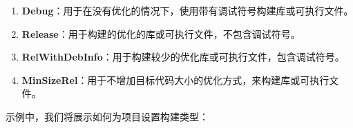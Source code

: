 \begin{enumerate}
\item \textbf{Debug}：用于在没有优化的情况下，使用带有调试符号构建库或可执行文件。

\item \textbf{Release}：用于构建的优化的库或可执行文件，不包含调试符号。

\item \textbf{RelWithDebInfo}：用于构建较少的优化库或可执行文件，包含调试符号。

\item \textbf{MinSizeRel}：用于不增加目标代码大小的优化方式，来构建库或可执行文件。

\end{enumerate}


示例中，我们将展示如何为项目设置构建类型：

